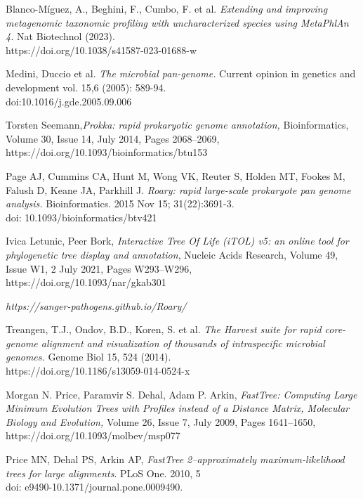 \documentclass[a4paper,titlepage]{book}
\begin{document}
\begin{thebibliography}{}
Blanco-Míguez, A., Beghini, F., Cumbo, F. et al. \emph{Extending and improving metagenomic taxonomic profiling with uncharacterized species using MetaPhlAn 4.} Nat Biotechnol (2023). \\https://doi.org/10.1038/s41587-023-01688-w


Medini, Duccio et al. \emph{The microbial pan-genome.} Current opinion in genetics and development vol. 15,6 (2005): 589-94. \\doi:10.1016/j.gde.2005.09.006

Torsten Seemann,\emph{Prokka: rapid prokaryotic genome annotation,} Bioinformatics, Volume 30, Issue 14, July 2014, Pages 2068–2069,\\ https://doi.org/10.1093/bioinformatics/btu153

Page AJ, Cummins CA, Hunt M, Wong VK, Reuter S, Holden MT, Fookes M, Falush D, Keane JA, Parkhill J. \emph{Roary: rapid large-scale prokaryote pan genome analysis.} Bioinformatics. 2015 Nov 15; 31(22):3691-3. \\doi: 10.1093/bioinformatics/btv421

Ivica Letunic, Peer Bork, \emph{Interactive Tree Of Life (iTOL) v5: an online tool for phylogenetic tree display and annotation}, Nucleic Acids Research, Volume 49, Issue W1, 2 July 2021, Pages W293–W296, \\https://doi.org/10.1093/nar/gkab301

\emph{https://sanger-pathogens.github.io/Roary/}

Treangen, T.J., Ondov, B.D., Koren, S. et al. \emph{The Harvest suite for rapid core-genome alignment and visualization of thousands of intraspecific microbial genomes.} Genome Biol 15, 524 (2014).\\https://doi.org/10.1186/s13059-014-0524-x

Morgan N. Price, Paramvir S. Dehal, Adam P. Arkin, \emph{FastTree: Computing Large Minimum Evolution Trees with Profiles instead of a Distance Matrix, Molecular Biology and Evolution,} Volume 26, Issue 7, July 2009, Pages 1641–1650, \\https://doi.org/10.1093/molbev/msp077


Price MN, Dehal PS, Arkin AP, \emph{FastTree 2–approximately maximum-likelihood trees for large alignments}. PLoS One. 2010, 5\\doi: e9490-10.1371/journal.pone.0009490.



\end{thebibliography}
\end{document}
